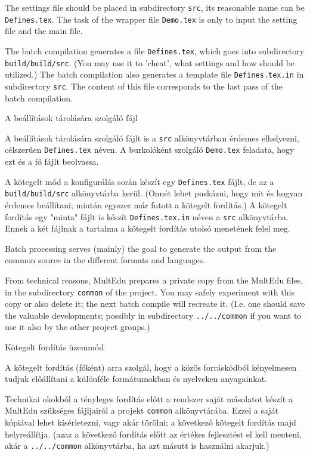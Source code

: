 {
The settings file should be placed in subdirectory \lstinline|src|, its reasonable name can be
\lstinline|Defines.tex|. The task of the wrapper file \lstinline|Demo.tex| is only to input
the setting file and the main file.

The batch compilation generates a file \lstinline|Defines.tex|, which goes into subdirectory
\lstinline|build/build/src|. (You may use it to 'cheat', what settings and how should be utilized.)
The batch compilation also generates a template file \lstinline|Defines.tex.in| in subdirectory \lstinline|src|.
The content of this file corresponds to the last pass of the batch compilation.
}
{A beállítások tárolására szolgáló fájl}
{
A beállítások tárolására szolgáló fájlt is a \lstinline|src| alkönyvtárban érdemes elhelyezni,
célszerűen \lstinline|Defines.tex| néven. A burkolóként szolgáló \lstinline|Demo.tex| feladata, hogy
ezt és a fő fájlt beolvassa.

A kötegelt mód a konfigurálás során készít egy \lstinline|Defines.tex| fájlt, de az a \lstinline|build/build/src|
alkönyvtárba kerül. (Onnét lehet puskázni, hogy mit és hogyan érdemes beállítani; miután egyszer már futott
a kötegelt fordítás.) A kötegelt fordítás egy "minta" fájlt is készít \lstinline|Defines.tex.in| néven a
\lstinline|src| alkönyvtárba. Ennek a két fájlnak a tartalma a kötegelt fordítás utolsó menetének felel meg.
}


{
Batch processing serves (mainly) the goal to generate the output
from the common source in the different formats and languages.

From technical reasons, \gls{MultEdu} prepares a private copy from
the \gls{MultEdu} files, in the subdirectory \lstinline|common|  of the project.
You may safely experiment with this copy or also delete it; the next
batch compile will recreate it. (I.e. one should save the valuable developments; possibly in subdirectory \lstinline|../../common|
if you want to use it also by the other project groups.)
}
{Kötegelt fordítás üzemmód}
{
A kötegelt fordítás (főként) arra szolgál, hogy a közös forráskódból kényelmesen tudjuk
előállítani a különféle formátumokban és nyelveken anyagainkat.

Technikai okokból a tényleges fordítás előtt a rendszer saját másolatot
készít a \gls{MultEdu} szükséges fájljairól a projekt \lstinline|common| alkönyvtárába.
Ezzel a saját kópiával lehet kísérletezni, vagy akár törölni;
a következő kötegelt fordítás majd helyreállítja. (azaz a következő fordítás előtt az értékes fejlesztést el kell menteni, akár a \lstinline|../../common| alkönyvtárba, ha azt másutt is használni akarjuk.)
}

